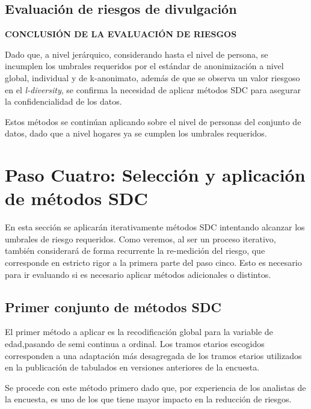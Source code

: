 \documentclass[]{book}
\theoremstyle{definition}
\theoremstyle{definition}
\theoremstyle{definition}
\theoremstyle{definition}
\theoremstyle{remark}
\begin{document}
\hypertarget{evaluaciuxf3n-de-riesgos-de-divulgaciuxf3n}{%
\subsection{Evaluación de riesgos de divulgación}\label{evaluaciuxf3n-de-riesgos-de-divulgaciuxf3n}}

\textbf{CONCLUSIÓN DE LA EVALUACIÓN DE RIESGOS}

Dado que, a nivel jerárquico, considerando hasta el nivel de persona, se incumplen los umbrales requeridos por el estándar de anonimización a nivel global, individual y de k-anonimato, además de que se observa un valor riesgoso en el \emph{l-diversity}, se confirma la necesidad de aplicar métodos SDC para asegurar la confidencialidad de los datos.

Estos métodos se continúan aplicando sobre el nivel de personas del conjunto de datos, dado que a nivel hogares ya se cumplen los umbrales requeridos.

\hypertarget{paso-cuatro-selecciuxf3n-y-aplicaciuxf3n-de-muxe9todos-sdc}{%
\section{Paso Cuatro: Selección y aplicación de métodos SDC}\label{paso-cuatro-selecciuxf3n-y-aplicaciuxf3n-de-muxe9todos-sdc}}

En esta sección se aplicarán iterativamente métodos SDC intentando alcanzar los umbrales de riesgo requeridos. Como veremos, al ser un proceso iterativo, también considerará de forma recurrente la re-medición del riesgo, que corresponde en estricto rigor a la primera parte del paso cinco. Esto es necesario para ir evaluando si es necesario aplicar métodos adicionales o distintos.

\hypertarget{primer-conjunto-de-muxe9todos-sdc}{%
\subsection{Primer conjunto de métodos SDC}\label{primer-conjunto-de-muxe9todos-sdc}}

El primer método a aplicar es la recodificación global para la variable de edad,pasando de semi continua a ordinal. Los tramos etarios escogidos corresponden a una adaptación más desagregada de los tramos etarios utilizados en la publicación de tabulados en versiones anteriores de la encuesta.

Se procede con este método primero dado que, por experiencia de los analistas de la encuesta, es uno de los que tiene mayor impacto en la reducción de riesgos.
\end{document}
